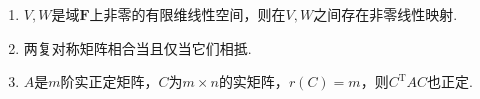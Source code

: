 \begin{enumerate}
\begin{enumerate}
        \item \(V,W\)是域\(\mathbf{F}\)上非零的有限维线性空间，则在\(V,W\)之间存在非零线性映射.

        \item 两复对称矩阵相合当且仅当它们相抵.

        \item \(A\)是\(m\)阶实正定矩阵，\(C\)为\(m\times n\)的实矩阵，\(r(C)=m\)，则\(C^\mathrm{T}AC\)也正定.
    \end{enumerate}
\end{enumerate}

\clearpage
